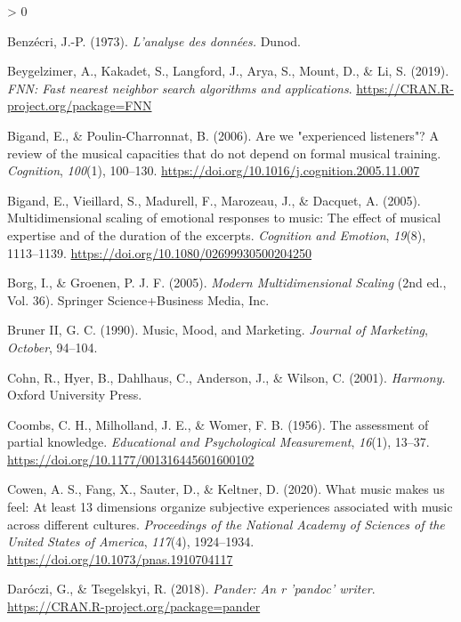 \documentclass[
  english,
  man]{apa6}
\newlength{\cslhangindent}
\newenvironment{CSLReferences}[2] %
 {%
  \setlength{\parindent}{0pt}
  \ifodd #1 \everypar{\setlength{\hangindent}{\cslhangindent}}\ignorespaces\fi
  \ifnum #2 > 0
  \setlength{\parskip}{#2\baselineskip}
  \fi
 }%
 {}
\begin{document}
\begin{CSLReferences}{1}{0}
\leavevmode\hypertarget{ref-Benzecri1973}{}%
Benzécri, J.-P. (1973). \emph{{L'analyse des données.}} Dunod.

\leavevmode\hypertarget{ref-R-FNN}{}%
Beygelzimer, A., Kakadet, S., Langford, J., Arya, S., Mount, D., \& Li, S. (2019). \emph{FNN: Fast nearest neighbor search algorithms and applications}. \url{https://CRAN.R-project.org/package=FNN}

\leavevmode\hypertarget{ref-Bigand2006}{}%
Bigand, E., \& Poulin-Charronnat, B. (2006). {Are we "experienced listeners"? A review of the musical capacities that do not depend on formal musical training}. \emph{Cognition}, \emph{100}(1), 100--130. \url{https://doi.org/10.1016/j.cognition.2005.11.007}

\leavevmode\hypertarget{ref-Bigand2005}{}%
Bigand, E., Vieillard, S., Madurell, F., Marozeau, J., \& Dacquet, A. (2005). {Multidimensional scaling of emotional responses to music: The effect of musical expertise and of the duration of the excerpts}. \emph{Cognition and Emotion}, \emph{19}(8), 1113--1139. \url{https://doi.org/10.1080/02699930500204250}

\leavevmode\hypertarget{ref-Borg2005}{}%
Borg, I., \& Groenen, P. J. F. (2005). \emph{{Modern Multidimensional Scaling}} (2nd ed., Vol. 36). Springer Science+Business Media, Inc.

\leavevmode\hypertarget{ref-BrunerII1990}{}%
Bruner II, G. C. (1990). {Music, Mood, and Marketing}. \emph{Journal of Marketing}, \emph{October}, 94--104.

\leavevmode\hypertarget{ref-Cohn2001}{}%
Cohn, R., Hyer, B., Dahlhaus, C., Anderson, J., \& Wilson, C. (2001). \emph{{Harmony}}. Oxford University Press.

\leavevmode\hypertarget{ref-Coombs1956}{}%
Coombs, C. H., Milholland, J. E., \& Womer, F. B. (1956). {The assessment of partial knowledge}. \emph{Educational and Psychological Measurement}, \emph{16}(1), 13--37. \url{https://doi.org/10.1177/001316445601600102}

\leavevmode\hypertarget{ref-Cowen2020}{}%
Cowen, A. S., Fang, X., Sauter, D., \& Keltner, D. (2020). {What music makes us feel: At least 13 dimensions organize subjective experiences associated with music across different cultures}. \emph{Proceedings of the National Academy of Sciences of the United States of America}, \emph{117}(4), 1924--1934. \url{https://doi.org/10.1073/pnas.1910704117}

\leavevmode\hypertarget{ref-R-pander}{}%
Daróczi, G., \& Tsegelskyi, R. (2018). \emph{Pander: An r 'pandoc' writer}. \url{https://CRAN.R-project.org/package=pander}


\end{CSLReferences}
\end{document}
